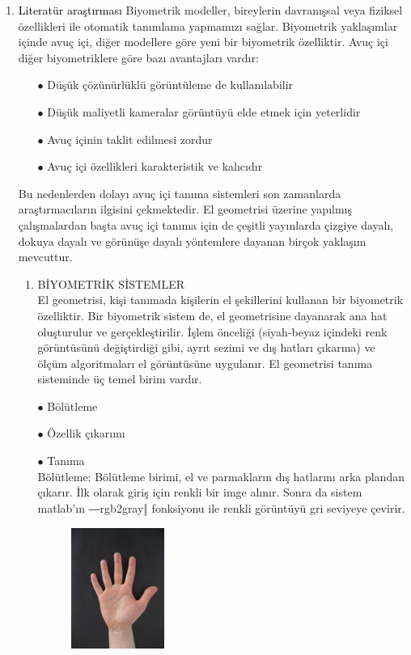\documentclass[11pt, a4paper]{article}
\begin{document}
\begin{enumerate}
	\item {\Large\textcolor{black}{Literatür araştırması}} \newline
	Biyometrik modeller, bireylerin davranışsal veya fiziksel özellikleri ile otomatik tanımlama yapmamızı sağlar. Biyometrik yaklaşımlar içinde avuç içi, diğer modellere göre yeni bir biyometrik özelliktir. Avuç içi diğer biyometriklere göre bazı avantajları vardır:
	\begin{itemize}
		\item[$\bullet$] Düşük çözünürlüklü görüntüleme de kullanılabilir
		\item[$\bullet$] Düşük maliyetli kameralar görüntüyü elde etmek için yeterlidir
		\item[$\bullet$] Avuç içinin taklit edilmesi zordur
		\item[$\bullet$] Avuç içi özellikleri karakteristik ve kalıcıdır
	\end{itemize}
	Bu nedenlerden dolayı avuç içi tanıma sistemleri son zamanlarda araştırmacıların ilgisini çekmektedir.  El geometrisi üzerine yapılmış çalışmalardan başta avuç içi tanıma için de çeşitli yayınlarda çizgiye dayalı, dokuya dayalı  ve görünüşe dayalı yöntemlere dayanan birçok yaklaşım mevcuttur.  
	\begin{enumerate}
		\item BİYOMETRİK SİSTEMLER \\
		El geometrisi, kişi tanımada kişilerin el şekillerini kullanan bir biyometrik özelliktir. Bir biyometrik sistem de, el geometrisine dayanarak ana hat oluşturulur ve gerçekleştirilir. İşlem önceliği (siyah-beyaz içindeki renk görüntüsünü değiştirdiği gibi, ayrıt sezimi ve dış hatları çıkarma) ve ölçüm algoritmaları el görüntüsüne uygulanır. El geometrisi tanıma sisteminde üç temel birim vardır. 
		\item[$\bullet$] Bölütleme
		\item[$\bullet$] Özellik çıkarımı
		\item[$\bullet$] Tanıma \\
		Bölütleme: Bölütleme birimi, el ve parmakların dış hatlarını arka plandan çıkarır. İlk olarak giriş için renkli bir imge alınır. Sonra da sistem matlab’ın ―rgb2gray‖ fonksiyonu ile renkli görüntüyü gri seviyeye çevirir.\cite{ergen2011biyometrik}
		\begin{figure}[!h]
			\centering
			\includegraphics{el.png}

\end{figure}
\end{enumerate}
\end{enumerate}
\end{document}
